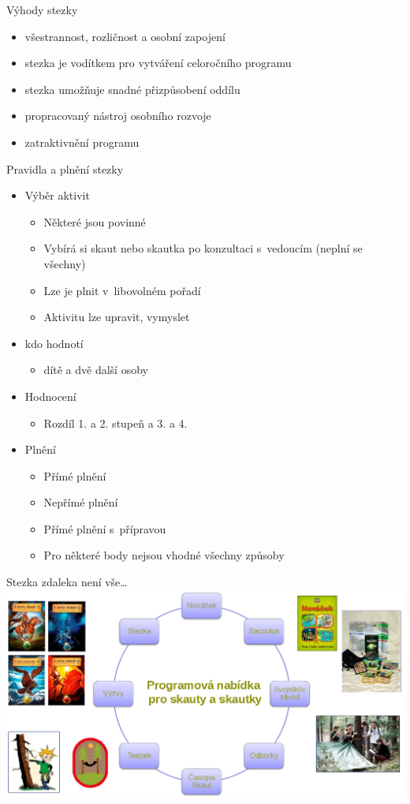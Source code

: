 \documentclass[compress,xelatex,xcolor=dvipsnames,hyperref={pdfpagelabels=false},print]{beamer}
\begin{document}
\begin{frame}{Výhody stezky}
\begin{itemize}
\item všestrannost, rozličnost a osobní zapojení
\item stezka je vodítkem pro vytváření celoročního programu
\item stezka umožňuje snadné přizpůsobení oddílu
\item propracovaný nástroj osobního rozvoje
\item zatraktivnění programu
\end{itemize}
\end{frame}

\begin{frame}{Pravidla a plnění stezky}
\begin{itemize}
\item Výběr aktivit
 \begin{itemize}
 \item Některé jsou povinné
 \item Vybírá si skaut nebo skautka po konzultaci s~vedoucím (neplní se všechny)
 \item Lze je plnit v~libovolném pořadí
 \item Aktivitu lze upravit, vymyslet
 \end{itemize}
\item kdo hodnotí
 \begin{itemize}
 \item dítě a dvě další osoby
 \end{itemize}
\item Hodnocení
 \begin{itemize}
 \item Rozdíl 1. a 2. stupeň a 3. a 4.
 \end{itemize}
\item Plnění
 \begin{itemize}
 \item Přímé plnění
 \item Nepřímé plnění
 \item Přímé plnění s~přípravou
 \item Pro některé body nejsou vhodné všechny způsoby
 \end{itemize}
\end{itemize}
\end{frame}

\begin{frame}{Stezka zdaleka není vše\ldots}
\includegraphics[width=\textwidth]{komplet.png}
\end{frame}
\end{document}
